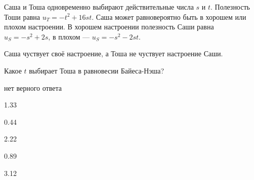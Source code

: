 
\begin{question}
Саша и Тоша одновременно выбирают действительные числа \(s\) и \(t\).
Полезность Тоши равна \(u_T = -t^2 + 16st\).
Саша может равновероятно быть в хорошем или плохом настроении.
В хорошем настроении полезность Саши равна \(u_S = -s^2 + 2s\), в плохом --- \(u_S = -s^2 - 2st\).

Саша чуствует своё настроение, а Тоша не чуствует настроение Саши.

Какое \(t\) выбирает Тоша в равновесии Байеса-Нэша?
\begin{answerlist}
  \item нет верного ответа
  \item 1.33
  \item 0.44
  \item 2.22
  \item 0.89
  \item 3.12
\end{answerlist}
\end{question}


